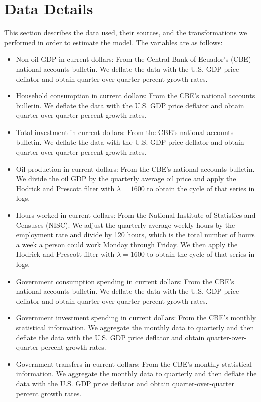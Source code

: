 \documentclass[12pt]{article}
\begin{document}
\section{Data Details}
\label{appendix:datadetails}
This section describes the data used, their sources, and the transformations we performed in order to estimate the model. The variables are as follows:
\begin{itemize}
    \item Non oil GDP in current dollars: From the Central Bank of Ecuador's (CBE) national accounts bulletin. We deflate the data with the U.S. GDP price deflator and obtain quarter-over-quarter percent growth rates.
    \item Household consumption in current dollars: From the CBE's national accounts bulletin. We deflate the data with the U.S. GDP price deflator and obtain quarter-over-quarter percent growth rates.
    \item Total investment in current dollars: From the CBE's national accounts bulletin. We deflate the data with the U.S. GDP price deflator and obtain quarter-over-quarter percent growth rates.
    \item Oil production in current dollars: From the CBE's national accounts bulletin. We divide the oil GDP by the quarterly average oil price and apply the Hodrick and Prescott filter with $\lambda=1600$ to obtain the cycle of that series in logs.
    \item Hours worked in current dollars: From the National Institute of Statistics and Censuses (NISC). We adjust the quarterly average weekly hours by the employment rate and divide by 120 hours, which is the total number of hours a week a person could work Monday through Friday. We then apply the Hodrick and Prescott filter with $\lambda=1600$ to obtain the cycle of that series in logs.
    \item Government consumption spending in current dollars: From the CBE's national accounts bulletin. We deflate the data with the U.S. GDP price deflator and obtain quarter-over-quarter percent growth rates.
    \item Government investment spending in current dollars: From the CBE's monthly statistical information. We aggregate the monthly data to quarterly and then deflate the data with the U.S. GDP price deflator and obtain quarter-over-quarter percent growth rates.
    \item Government transfers in current dollars: From the CBE's monthly statistical information. We aggregate the monthly data to quarterly and then deflate the data with the U.S. GDP price deflator and obtain quarter-over-quarter percent growth rates.

\end{itemize}
\end{document}

